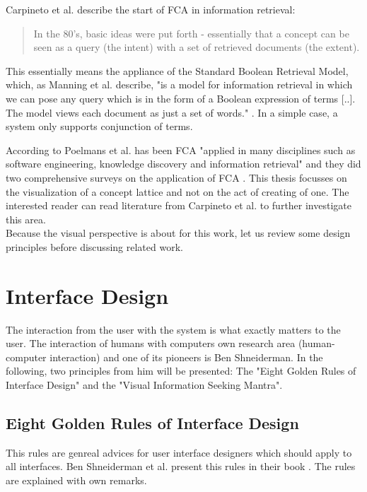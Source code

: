 \documentclass[11pt]{report}
\begin{document}
Carpineto et al.\cite{Carpineto2005} describe the start of FCA in information retrieval:

\begin{quote}
In the 80's, basic ideas were put forth - essentially that a concept can be seen as a query (the intent) with a set of retrieved documents (the extent).
\end{quote}

This essentially means the appliance of the Standard Boolean Retrieval Model, which, as Manning et al. \cite{Manning2009} describe, "is a model for information retrieval in which we can pose any query which is in the form of a Boolean expression of terms [..]. The model views each document as just a set of words." . In a simple case, a system only supports conjunction of terms.

According to Poelmans et al. has been FCA "applied in many disciplines such as software engineering, knowledge discovery and information retrieval" \cite{Poelmans2013} and they did two comprehensive surveys on the application of FCA \cite{Poelmans2013, Poelmans2013b}. This thesis focusses on the visualization of a concept lattice and not on the act of creating of one. The interested reader can read literature from Carpineto et al. \cite{carpineto2004concept,Carpineto2005} to further investigate this area. \\

Because the visual perspective is about for this work, let us review some design principles before discussing related work.

\section{Interface Design}

The interaction from the user with the system is what exactly matters to the user. The interaction of humans with computers own research area (human-computer interaction) and one of its pioneers is Ben Shneiderman. In the following, two principles from him will be presented: The "Eight Golden Rules of Interface Design" and the "Visual Information Seeking Mantra".

\subsection{Eight Golden Rules of Interface Design}

This rules are genreal advices for user interface designers which should apply to all interfaces. Ben Shneiderman et al. present this rules in their book \cite{Shneiderman2010}. The rules are explained with own remarks. \\
\end{document}
